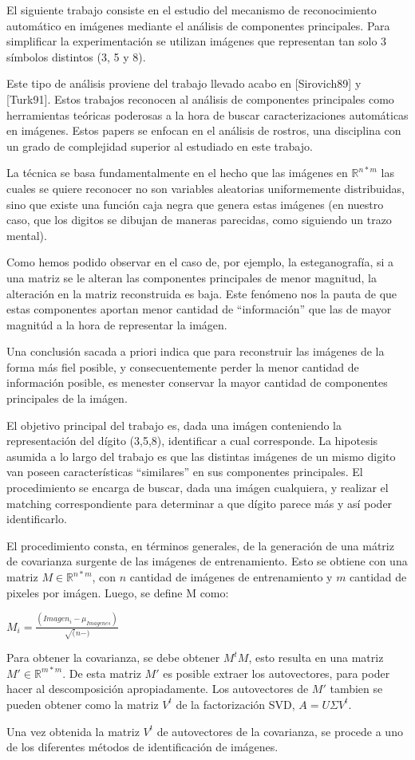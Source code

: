 El siguiente trabajo consiste en el estudio del mecanismo de reconocimiento autom\'atico 
en im\'agenes mediante el an\'alisis de componentes principales. Para simplificar la
experimentaci\'on se utilizan im\'agenes que representan tan solo 3 s\'imbolos distintos
(3, 5 y 8).

Este tipo de an\'alisis proviene del trabajo llevado acabo en [Sirovich89] y [Turk91]. Estos
trabajos reconocen al an\'alisis de componentes principales como herramientas te\'oricas poderosas
a la hora de buscar caracterizaciones autom\'aticas en im\'agenes. Estos papers se enfocan en el
an\'alisis de rostros, una disciplina con un grado de complejidad superior al estudiado en este
trabajo. 

La t\'ecnica se basa fundamentalmente en el hecho que las im\'agenes en $\mathbb{R}^{n * m}$ las cuales se
quiere reconocer no son variables aleatorias uniformemente distribuidas, sino que existe una funci\'on caja 
negra que genera estas im\'agenes (en nuestro caso, que los digitos se dibujan de maneras parecidas, 
como siguiendo un trazo mental).

Como hemos podido observar en el caso de, por ejemplo, la esteganograf\'ia, si a una matriz se le alteran
las componentes principales de menor magnitud, la alteraci\'on en la matriz reconstruida es baja. 
Este fen\'omeno nos la pauta de que estas componentes aportan menor cantidad de ``informaci\'on'' 
que las de mayor magnit\'ud a la hora de representar la im\'agen.

Una conclusi\'on sacada a priori indica que para reconstruir las im\'agenes de la forma m\'as fiel posible,
y consecuentemente perder la menor cantidad de informaci\'on posible, es menester conservar la mayor cantidad
de componentes principales de la im\'agen. 

El objetivo principal del trabajo es, dada una im\'agen conteniendo la representaci\'on del d\'igito (3,5,8), 
identificar a cual corresponde. La hipotesis asumida a lo largo del trabajo es que las distintas im\'agenes 
de un mismo digito van poseen caracter\'isticas ``similares'' en sus componentes principales. 
El procedimiento se encarga de buscar, dada una im\'agen cualquiera, y realizar el matching correspondiente 
para determinar a que d\'igito parece m\'as y as\'i poder identificarlo.

El procedimiento consta, en t\'erminos generales, de la generaci\'on de una m\'atriz de covarianza surgente 
de las im\'agenes de entrenamiento. Esto se obtiene con una matriz $M \in \mathbb{R}^{n * m}$, con $n$ cantidad
de im\'agenes de entrenamiento y $m$ cantidad de pixeles por im\'agen. Luego, se define M como:

$M_i = \frac{(Imagen_i - \mu_{Imagenes})}{\sqrt(n-)}$

Para obtener la covarianza, se debe obtener $M^t M$, esto resulta en una matriz $M' \in \mathbb{R}^{m * m}$.
De esta matriz $M'$ es posible extraer los autovectores, para poder hacer al descomposici\'on apropiadamente.
Los autovectores de $M'$ tambien se pueden obtener como la matriz $V^t$ de la factorizaci\'on SVD, $A=U\Sigma V^t$.

Una vez obtenida la matriz $V^t$ de autovectores de la covarianza, se procede a uno de los diferentes m\'etodos de
identificaci\'on de im\'agenes.

